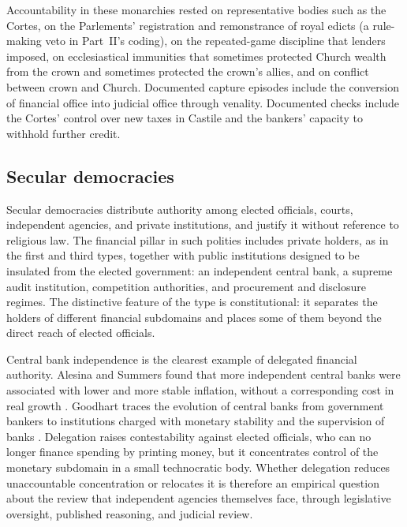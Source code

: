 \documentclass[11pt,letterpaper]{article}
\theoremstyle{definition}
\theoremstyle{remark}
\begin{document}
Accountability in these monarchies rested on representative bodies such as the Cortes, on the Parlements' registration and remonstrance of royal edicts (a rule-making veto in Part~II's coding), on the repeated-game discipline that lenders imposed, on ecclesiastical immunities that sometimes protected Church wealth from the crown and sometimes protected the crown's allies, and on conflict between crown and Church. Documented capture episodes include the conversion of financial office into judicial office through venality. Documented checks include the Cortes' control over new taxes in Castile and the bankers' capacity to withhold further credit.

\subsection{Secular democracies}

Secular democracies distribute authority among elected officials, courts, independent agencies, and private institutions, and justify it without reference to religious law. The financial pillar in such polities includes private holders, as in the first and third types, together with public institutions designed to be insulated from the elected government: an independent central bank, a supreme audit institution, competition authorities, and procurement and disclosure regimes. The distinctive feature of the type is constitutional: it separates the holders of different financial subdomains and places some of them beyond the direct reach of elected officials.

Central bank independence is the clearest example of delegated financial authority. Alesina and Summers found that more independent central banks were associated with lower and more stable inflation, without a corresponding cost in real growth \citep{alesina1993}. Goodhart traces the evolution of central banks from government bankers to institutions charged with monetary stability and the supervision of banks \citep{goodhart1988}. Delegation raises contestability against elected officials, who can no longer finance spending by printing money, but it concentrates control of the monetary subdomain in a small technocratic body. Whether delegation reduces unaccountable concentration or relocates it is therefore an empirical question about the review that independent agencies themselves face, through legislative oversight, published reasoning, and judicial review.
\end{document}
